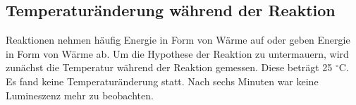 \subsection{Temperaturänderung während der Reaktion}

Reaktionen nehmen häufig Energie in Form von Wärme auf oder geben Energie in Form von Wärme ab. Um die Hypothese der Reaktion zu untermauern, wird zunächst die Temperatur während der Reaktion gemessen. Diese beträgt 25 $^\circ$C. Es fand keine Temperaturänderung statt. Nach sechs Minuten war keine Lumineszenz mehr zu beobachten. 


